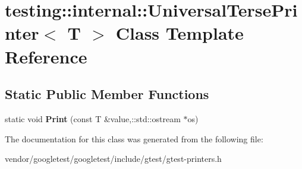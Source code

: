 \hypertarget{classtesting_1_1internal_1_1UniversalTersePrinter}{}\section{testing\+:\+:internal\+:\+:Universal\+Terse\+Printer$<$ T $>$ Class Template Reference}
\label{classtesting_1_1internal_1_1UniversalTersePrinter}
\subsection*{Static Public Member Functions}
\begin{DoxyCompactItemize}
\item 
static void {\bfseries Print} (const T \&value,\+::std\+::ostream $\ast$os)\hypertarget{classtesting_1_1internal_1_1UniversalTersePrinter_a2e16ee42c9b18fca397cd95f32e8e879}{}\label{classtesting_1_1internal_1_1UniversalTersePrinter_a2e16ee42c9b18fca397cd95f32e8e879}

\end{DoxyCompactItemize}


The documentation for this class was generated from the following file\+:\begin{DoxyCompactItemize}
\item 
vendor/googletest/googletest/include/gtest/gtest-\/printers.\+h\end{DoxyCompactItemize}
